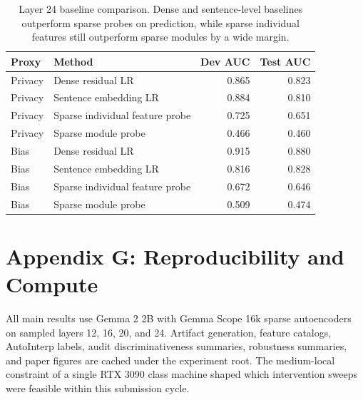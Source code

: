 \documentclass{article}
\begin{document}
\begin{table}[h]
    \centering
    \caption{Layer 24 baseline comparison. Dense and sentence-level baselines outperform sparse probes on prediction, while sparse individual features still outperform sparse modules by a wide margin.}
    \label{tab:baseline-appendix}
    \small
    \begin{tabular}{llrr}
        \toprule
        Proxy & Method & Dev AUC & Test AUC \\
        \midrule
        Privacy & Dense residual LR & 0.865 & 0.823 \\
        Privacy & Sentence embedding LR & 0.884 & 0.810 \\
        Privacy & Sparse individual feature probe & 0.725 & 0.651 \\
        Privacy & Sparse module probe & 0.466 & 0.460 \\
        Bias & Dense residual LR & 0.915 & 0.880 \\
        Bias & Sentence embedding LR & 0.816 & 0.828 \\
        Bias & Sparse individual feature probe & 0.672 & 0.646 \\
        Bias & Sparse module probe & 0.509 & 0.474 \\
        \bottomrule
    \end{tabular}
\end{table}

\section{Appendix G: Reproducibility and Compute}

All main results use Gemma 2 2B with Gemma Scope 16k sparse autoencoders on sampled layers 12, 16, 20, and 24. Artifact generation, feature catalogs, AutoInterp labels, audit discriminativeness summaries, robustness summaries, and paper figures are cached under the experiment root. The medium-local constraint of a single RTX 3090 class machine shaped which intervention sweeps were feasible within this submission cycle.
\end{document}
